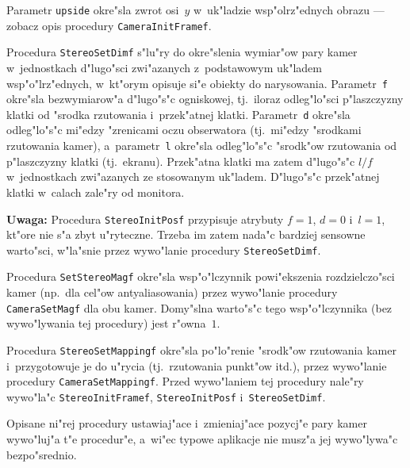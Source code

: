 Parametr \texttt{upside} okre"sla zwrot osi~$y$ w~uk"ladzie wsp"olrz"ednych
obrazu --- zobacz opis procedury \texttt{CameraInitFramef}.

\vspace{\bigskipamount}
Procedura \texttt{StereoSetDimf} s"lu"ry do okre"slenia wymiar"ow pary kamer
w~jednostkach d"lugo"sci zwi"azanych z~podstawowym uk"ladem
wsp"o"lrz"ednych, w~kt"orym opisuje si"e obiekty do narysowania.
Parametr~\texttt{f} okre"sla bezwymiarow"a d"lugo"s"c ogniskowej, tj.\ iloraz
odleg"lo"sci p"laszczyzny klatki od "srodka rzutowania i~przek"atnej klatki.
Parametr~\texttt{d} okre"sla odleg"lo"s"c mi"edzy "zrenicami oczu
obserwatora (tj.\ mi"edzy "srodkami rzutowania kamer), a~parametr~\texttt{l}
okre"sla odleg"lo"s"c "srodk"ow rzutowania od p"laszczyzny klatki (tj.\
ekranu). Przek"atna klatki ma zatem d"lugo"s"c $l/f$ w~jednostkach
zwi"azanych ze stosowanym uk"ladem. D"lugo"s"c przek"atnej klatki w~calach
zale"ry od monitora.

\vspace{\medskipamount}\noindent
\textbf{Uwaga:} Procedura \texttt{StereoInitPosf} przypisuje atrybuty $f=1$,
$d=0$ i~$l=1$, kt"ore nie s"a zbyt u"ryteczne. Trzeba im zatem nada"c
bardziej sensowne warto"sci, w"la"snie przez wywo"lanie procedury
\texttt{StereoSetDimf}.

\vspace{\bigskipamount}
Procedura \texttt{SetStereoMagf} okre"sla wsp"o"lczynnik powi"ekszenia
rozdzielczo"sci kamer (np.\ dla cel"ow antyaliasowania) przez wywo"lanie
procedury \texttt{CameraSetMagf} dla obu kamer. Domy"slna warto"s"c tego
wsp"o"lczynnika (bez wywo"lywania tej procedury) jest r"owna~$1$.

\vspace{\bigskipamount}
Procedura \texttt{StereoSetMappingf} okre"sla po"lo"renie "srodk"ow rzutowania
kamer i~przygotowuje je do u"rycia (tj.\ rzutowania punkt"ow itd.), przez
wywo"lanie procedury \texttt{CameraSetMappingf}. Przed wywo"laniem tej procedury
nale"ry wywo"la"c \texttt{StereoInitFramef}, \texttt{StereoInitPosf}
i~\texttt{StereoSetDimf}.

Opisane ni"rej procedury ustawiaj"ace i~zmieniaj"ace pozycj"e pary kamer
wywo"luj"a t"e procedur"e, a~wi"ec typowe aplikacje nie musz"a jej
wywo"lywa"c bezpo"srednio.

